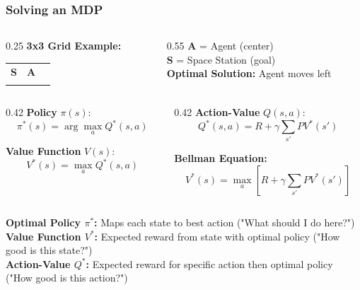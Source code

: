 \documentclass{beamer}
\begin{document}
\begin{frame}
\frametitle{Solving an MDP}
\begin{columns}
\begin{column}{0.25\textwidth}
\textbf{3x3 Grid Example:}
\begin{center}
\begin{tabular}{|c|c|c|}
\hline
 & & \\
\hline
\textbf{S} & \textbf{A} & \\
\hline
 & & \\
\hline
\end{tabular}
\end{center}
\end{column}
\begin{column}{0.55\textwidth}
\textbf{A} = Agent (center)\\
\textbf{S} = Space Station (goal)\\
\textbf{Optimal Solution:} Agent moves left
\end{column}
\end{columns}

\vspace{0.2cm}
\begin{columns}
\begin{column}{0.42\textwidth}
\textbf{Policy} $\pi(s)$:
$$\pi^*(s) = \arg\max_a Q^*(s,a)$$

\textbf{Value Function} $V(s)$:
$$V^*(s) = \max_a Q^*(s,a)$$
\end{column}
\begin{column}{0.42\textwidth}
\textbf{Action-Value} $Q(s,a)$:
$$Q^*(s,a) = R + \gamma \sum_{s'} P V^*(s')$$

\textbf{Bellman Equation:}
$$V^*(s) = \max_a [R + \gamma \sum_{s'} P V^*(s')]$$
\end{column}
\end{columns}

\vspace{0.1cm}
{\tiny
\textbf{Optimal Policy $\pi^*$:} Maps each state to best action ("What should I do here?")\\
\textbf{Value Function $V^*$:} Expected reward from state with optimal policy ("How good is this state?")\\
\textbf{Action-Value $Q^*$:} Expected reward for specific action then optimal policy ("How good is this action?")
}
\end{frame}
\end{document}
